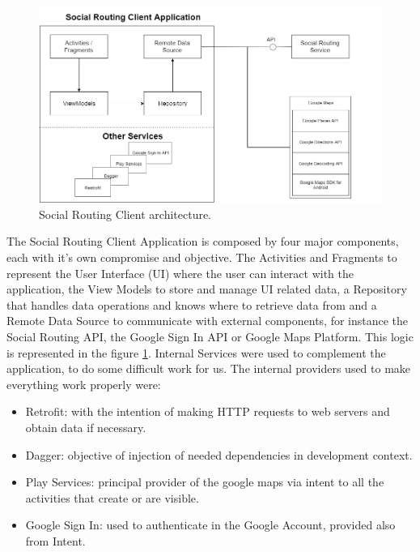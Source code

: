 \begin{figure}[h]            
        \includegraphics[width=\textwidth]{images/project-structure/social-routing-client-application-structure.PNG}
        \caption{Social Routing Client architecture.}
        \label{fig:clientarchitecture}
\end{figure}

The Social Routing Client Application is composed by four major components, each with it's own compromise and objective.
The Activities\cite{activities} and Fragments\cite{fragments} to represent the User Interface (UI) where the user can interact with the application, the 
View Models\cite{viewmodel} to store and manage UI related data, a Repository that handles data operations and knows where to retrieve data from and a 
Remote Data Source to communicate with external components, for instance the Social Routing API, the Google Sign In API or Google Maps Platform. 
This logic is represented in the figure \ref{fig:clientarchitecture}.
Internal Services were used to complement the application, to do some difficult work for us. The internal providers used to make everything work properly were:
\begin{itemize}
        \item Retrofit: with the intention of making HTTP requests to web servers and obtain data if necessary.
        \item Dagger: objective of injection of needed dependencies in development context.
        \item Play Services: principal provider of the google maps via intent to all the activities that create or are visible.
        \item Google Sign In: used to authenticate in the Google Account, provided also from Intent.
\end{itemize}   

